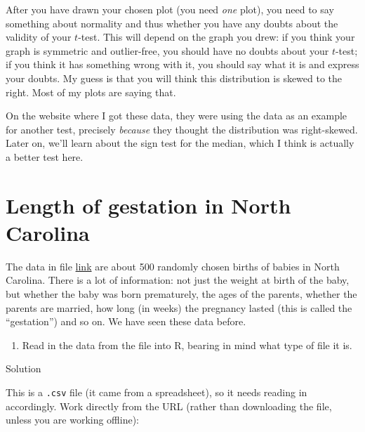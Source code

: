 \documentclass[]{tufte-book}
\providecommand{\tightlist}{%
  \setlength{\itemsep}{0pt}\setlength{\parskip}{0pt}}
\theoremstyle{definition}
\theoremstyle{definition}
\theoremstyle{definition}
\theoremstyle{remark}
\begin{document}
After you have drawn your chosen plot (you need \emph{one} plot), you
need to say something about normality and thus whether you have any
doubts about the validity of your \(t\)-test. This will depend on the
graph you drew: if you think your graph is symmetric and outlier-free,
you should have no doubts about your \(t\)-test; if you think it has
something wrong with it, you should say what it is and express your
doubts. My guess is that you will think this distribution is skewed to
the right. Most of my plots are saying that.

On the website where I got these data, they were using the data as an
example for another test, precisely \emph{because} they thought the
distribution was right-skewed. Later on, we'll learn about the sign test
for the median, which I think is actually a better test here.

\hypertarget{length-of-gestation-in-north-carolina}{%
\section{Length of gestation in North
Carolina}\label{length-of-gestation-in-north-carolina}}

The data in file
\href{http://www.utsc.utoronto.ca/~butler/c32/ncbirths.csv}{link} are
about 500 randomly chosen births of babies in North Carolina. There is a
lot of information: not just the weight at birth of the baby, but
whether the baby was born prematurely, the ages of the parents, whether
the parents are married, how long (in weeks) the pregnancy lasted (this
is called the ``gestation'') and so on. We have seen these data before.

\begin{enumerate}
\def\labelenumi{(\alph{enumi})}
\tightlist
\item
  Read in the data from the file into R, bearing in mind what type of
  file it is.
\end{enumerate}

Solution

This is a \texttt{.csv} file (it came from a spreadsheet), so it needs
reading in accordingly. Work directly from the URL (rather than
downloading the file, unless you are working offline):
\end{document}
